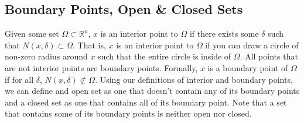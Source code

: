 \subsection{Boundary Points, Open \& Closed Sets}
\noindent
Given some set $\Omega \subset \mathbb{R}^n$, $x$ is an interior point to $\Omega$ if there exists some $\delta$ such that $N(x, \delta) \subset \Omega$.
That is, $x$ is an interior point to $\Omega$ if you can draw a circle of non-zero radius around $x$ such that the entire circle is inside of $\Omega$.
All points that are not interior points are boundary points.
Formally, $x$ is a boundary point of $\Omega$ if for all $\delta$,  $N(x,\delta) \not\subset \Omega$.
Using our definitions of interior and boundary points, we can define and open set as one that doesn't contain any of its boundary points and a closed set as one that contains all of its boundary point. Note that a set that contains some of its boundary points is neither open nor closed.